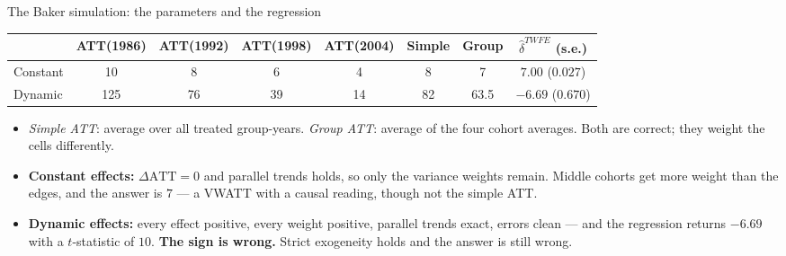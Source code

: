 \documentclass[
  11pt,
  ignorenonframetext,
  aspectratio=169,
]{beamer}
\providecommand{\tightlist}{%
  \setlength{\itemsep}{0pt}\setlength{\parskip}{0pt}}
\begin{document}
\begin{frame}{The Baker simulation: the parameters and the regression}
\protect{}\label{the-baker-simulation-the-parameters-and-the-regression}
\begin{center}\scriptsize
\begin{tabular}{lcccccc|c}
\toprule
 & ATT(1986) & ATT(1992) & ATT(1998) & ATT(2004) & Simple & Group & $\hat\delta^{TWFE}$ (s.e.) \\
\midrule
Constant & 10 & 8 & 6 & 4 & 8 & 7 & $7.00$ ($0.027$) \\
Dynamic & 125 & 76 & 39 & 14 & 82 & 63.5 & $\mathbf{-6.69}$ ($0.670$) \\
\bottomrule
\end{tabular}
\end{center}

\begin{itemize}
\tightlist
\item
  \emph{Simple ATT}: average over all treated group-years. \emph{Group
  ATT}: average of the four cohort averages. Both are correct; they
  weight the cells differently.
\item
  \textbf{Constant effects:} \(\Delta\text{ATT} = 0\) and parallel
  trends holds, so only the variance weights remain. Middle cohorts get
  more weight than the edges, and the answer is \(7\) --- a VWATT with a
  causal reading, though not the simple ATT.
\item
  \textbf{Dynamic effects:} every effect positive, every weight
  positive, parallel trends exact, errors clean --- and the regression
  returns \(\mathbf{-6.69}\) with a \(t\)-statistic of \(10\).
  \textbf{The sign is wrong.} Strict exogeneity holds and the answer is
  still wrong.
\end{itemize}
\end{frame}
\end{document}
